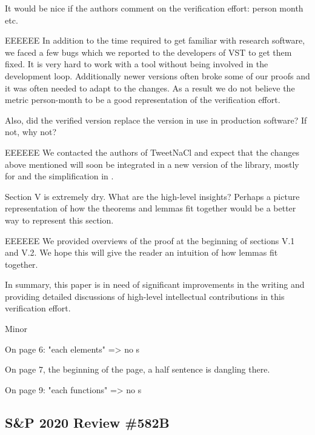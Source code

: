 It would be nice if the authors comment on the verification
effort: person month etc.

\begin{answer}{EEEEEE}
  In addition to the time required to get familiar with
  research software, we faced a few bugs which we reported
  to the developers of VST to get them fixed.
  It is very hard to work with a tool without being involved
  in the development loop. Additionally newer versions often
  broke some of our proofs and it was often needed to adapt
  to the changes.
  As a result we do not believe the metric person-month to be
  a good representation of the verification effort.
\end{answer}

Also, did the verified version replace the version in use in
production software? If not, why not?

\begin{answer}{EEEEEE}
  We contacted the authors of TweetNaCl and expect that
  the changes above mentioned will soon be integrated in a
  new version of the library, mostly for  and the
  simplification in .
\end{answer}

Section V is extremely dry. What are the high-level insights?
Perhaps a picture representation of how the theorems
and lemmas fit together would be a better way to represent
this section.

\begin{answer}{EEEEEE}
  We provided overviews of the proof at the beginning of sections
  V.1 and V.2. We hope this will give the reader an intuition
  of how lemmas fit together.
\end{answer}

In summary, this paper is in need of significant improvements
in the writing and providing detailed discussions of
high-level intellectual contributions in this verification effort.

  {\color{gray}
    Minor

    On page 6: "each elements" => no s

    On page 7, the beginning of the page, a half sentence is
    dangling there.

    On page 9: "each functions" => no s}


\subsection{S\&P 2020 Review \#582B}

